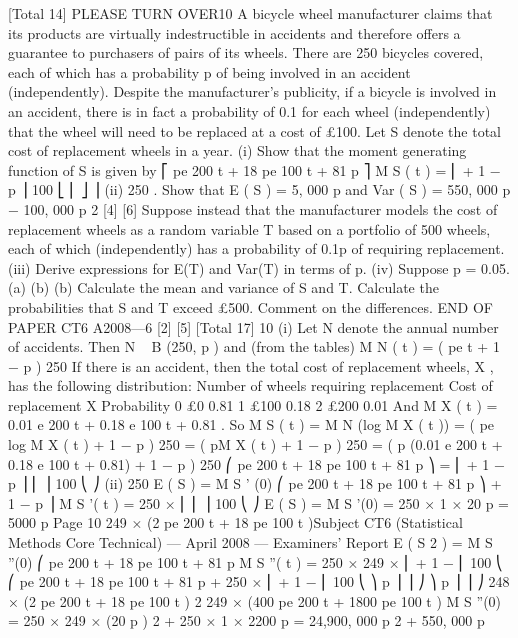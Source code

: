 [Total 14]
PLEASE TURN OVER10
A bicycle wheel manufacturer claims that its products are virtually indestructible in
accidents and therefore offers a guarantee to purchasers of pairs of its wheels. There
are 250 bicycles covered, each of which has a probability p of being involved in an
accident (independently). Despite the manufacturer’s publicity, if a bicycle is
involved in an accident, there is in fact a probability of 0.1 for each wheel
(independently) that the wheel will need to be replaced at a cost of £100. Let S denote
the total cost of replacement wheels in a year.
(i)
Show that the moment generating function of S is given by
⎡ pe 200 t + 18 pe 100 t + 81 p
⎤
M S ( t ) = ⎢
+ 1 − p ⎥
100
⎣ ⎢
⎦ ⎥
(ii)
250
.
Show that E ( S ) = 5, 000 p and Var ( S ) = 550, 000 p − 100, 000 p 2
[4]
[6]
Suppose instead that the manufacturer models the cost of replacement wheels
as a random variable T based on a portfolio of 500 wheels, each of which
(independently) has a probability of 0.1p of requiring replacement.
(iii) Derive expressions for E(T) and Var(T) in terms of p.
(iv) Suppose p = 0.05.
(a)
(b)
(b)
Calculate the mean and variance of S and T.
Calculate the probabilities that S and T exceed £500.
Comment on the differences.
END OF PAPER
CT6 A2008—6
[2]
[5]
[Total 17]
10
(i)
Let N denote the annual number of accidents. Then N ~ B (250, p ) and (from the tables) M N ( t ) = ( pe t + 1 − p ) 250
If there is an accident, then the total cost of replacement wheels, X , has the following distribution:
Number of wheels requiring replacement
Cost of replacement X
Probability
0
£0
0.81
1
£100
0.18
2
£200
0.01
And M X ( t ) = 0.01 e 200 t + 0.18 e 100 t + 0.81 .
So
M S ( t ) = M N (log M X ( t ))
= ( pe log M X ( t ) + 1 − p ) 250
= ( pM X ( t ) + 1 − p ) 250
= ( p (0.01 e 200 t + 0.18 e 100 t + 0.81) + 1 − p ) 250
⎛ pe 200 t + 18 pe 100 t + 81 p
⎞
= ⎜
+ 1 − p ⎟
⎜
⎟
100
⎝
⎠
(ii)
250
E ( S ) = M S ' (0)
⎛ pe 200 t + 18 pe 100 t + 81 p
⎞
+ 1 − p ⎟
M S '( t ) = 250 × ⎜
⎜
⎟
100
⎝
⎠
E ( S ) = M S '(0) = 250 × 1 × 20 p = 5000 p
Page 10
249
× (2 pe 200 t + 18 pe 100 t )Subject CT6 (Statistical Methods Core Technical) — April 2008 — Examiners’ Report
E ( S 2 ) = M S ''(0)
⎛ pe 200 t + 18 pe 100 t + 81 p
M S ''( t ) = 250 × 249 × ⎜
+ 1 −
⎜
100
⎝
⎛ pe 200 t + 18 pe 100 t + 81 p
+ 250 × ⎜
+ 1 −
⎜
100
⎝
⎞
p ⎟
⎟
⎠
⎞
p ⎟
⎟
⎠
248
× (2 pe 200 t + 18 pe 100 t ) 2
249
× (400 pe 200 t + 1800 pe 100 t )
M S ''(0) = 250 × 249 × (20 p ) 2 + 250 × 1 × 2200 p = 24,900, 000 p 2 + 550, 000 p
